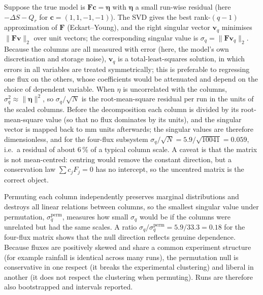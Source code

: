 \label{sec:svdtheory}
Suppose the true model is $\mathbf F\mathbf c=\boldsymbol\eta$ with $\boldsymbol\eta$ a small run-wise residual (here $-\Delta S-Q_r$ for $\mathbf c=(1,1,-1,-1)$). The SVD gives the best rank-$(q-1)$ approximation of $\mathbf F$ (Eckart--Young), and the right singular vector $\mathbf v_q$ minimises $\|\mathbf F\mathbf v\|_2$ over unit vectors; the corresponding singular value is $\sigma_q=\|\mathbf F\mathbf v_q\|_2$. Because the columns are all measured with error (here, the model's own discretisation and storage noise), $\mathbf v_q$ is a total-least-squares solution, in which errors in all variables are treated symmetrically; this is preferable to regressing one flux on the others, whose coefficients would be attenuated and depend on the choice of dependent variable. When $\eta$ is uncorrelated with the columns, $\sigma_q^2\approx\|\boldsymbol\eta\|^2$, so $\sigma_q/\sqrt N$ is the root-mean-square residual per run in the units of the scaled columns. Before the decomposition each column is divided by its root-mean-square value (so that no flux dominates by its units), and the singular vector is mapped back to mm units afterwards; the singular values are therefore dimensionless, and for the four-flux subsystem $\sigma_q/\sqrt N=5.9/\sqrt{10041}=0.059$, i.e.\ a residual of about 6\,\% of a typical column scale. A caveat is that the matrix is not mean-centred: centring would remove the constant direction, but a conservation law $\sum c_jF_j=0$ has no intercept, so the uncentred matrix is the correct object.

Permuting each column independently preserves marginal distributions and destroys all linear relations between columns, so the smallest singular value under permutation, $\sigma_q^{\mathrm{perm}}$, measures how small $\sigma_q$ would be if the columns were unrelated but had the same scales. A ratio $\sigma_q/\sigma_q^{\mathrm{perm}}=5.9/33.3=0.18$ for the four-flux matrix shows that the null direction reflects genuine dependence. Because fluxes are positively skewed and share a common experiment structure (for example rainfall is identical across many runs), the permutation null is conservative in one respect (it breaks the experimental clustering) and liberal in another (it does not respect the clustering when permuting). Runs are therefore also bootstrapped and intervals reported.

